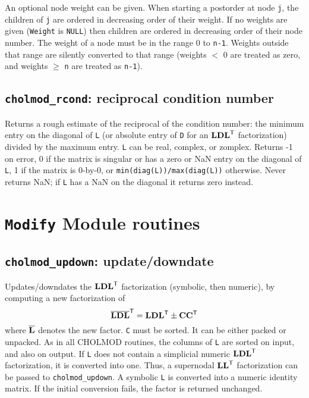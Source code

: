 \documentclass[11pt]{article}
\newcommand{\m}[1]{{\bf{#1}}}       %
\newcommand{\tr}{^{\sf T}}          %
\newcommand{\new}[1]{\overline{#1}}
\begin{document}
An optional node weight can be given.  When starting a postorder at node {\tt j},
the children of {\tt j} are ordered in decreasing order of their weight.
If no weights are given ({\tt Weight} is {\tt NULL}) then children are ordered in
decreasing order of their node number.  The weight of a node must be in the
range 0 to {\tt n-1}.  Weights outside that range are silently converted to that
range (weights $<$ 0 are treated as zero, and weights $\ge$ {\tt n} are treated as {\tt n-1}).

\subsection{{\tt cholmod\_rcond}: reciprocal condition number}


Returns a rough estimate of the reciprocal of the condition number:
the minimum entry on the diagonal of {\tt L} (or absolute entry of {\tt D} for an $\m{LDL}\tr$
factorization) divided by the maximum entry.  {\tt L} can be real, complex, or
zomplex.  Returns -1 on error, 0 if the matrix is singular or has a zero or NaN
entry on the diagonal of {\tt L}, 1 if the matrix is 0-by-0, or
{\tt min(diag(L))/max(diag(L))} otherwise.  Never returns NaN; if {\tt L} has a NaN on
the diagonal it returns zero instead.

\newpage \section{{\tt Modify} Module routines}

\subsection{{\tt cholmod\_updown}: update/downdate}


Updates/downdates the $\m{LDL}\tr$ factorization (symbolic, then numeric), by
computing a new factorization of
\[
\new{\m{L}}\new{\m{D}}\new{\m{L}}\tr = \m{LDL}\tr \pm \m{CC}\tr
\]
where $\new{\m{L}}$ denotes the new factor.
{\tt C} must be sorted.  It can be either packed or unpacked.  As in all CHOLMOD
routines, the columns of {\tt L} are sorted on input, and also on output.
If {\tt L} does not contain a simplicial numeric $\m{LDL}\tr$ factorization, it
is converted into one.  Thus, a supernodal $\m{LL}\tr$ factorization
can be passed to {\tt cholmod\_updown}.
A symbolic {\tt L} is converted into a numeric identity matrix.
If the initial conversion fails, the factor is returned unchanged.
\end{document}
